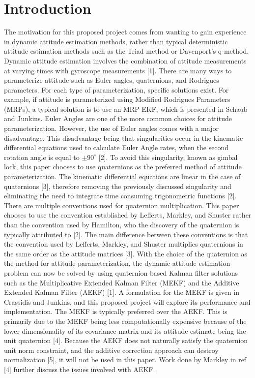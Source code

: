 \documentclass[12pt]{report}
\begin{document}
\newpage
\section*{Introduction}
\noindent The motivation for this proposed project comes from wanting to gain experience in dynamic attitude estimation methods, rather than typical deterministic attitude estimation methods such as the Triad method or Davenport's q-method.  Dynamic attitude estimation involves the combination of attitude measurements at varying times with gyroscope measurements [1]. There are many ways to parameterize attitude such as Euler angles, quaternions, and Rodrigues parameters. For each type of parameterization, specific solutions exist. For example, if attitude is parameterized using Modified Rodrigues Parameters (MRPs), a typical solution is to use an MRP-EKF, which is presented in Schaub and Junkins. Euler Angles are one of the more common choices for attitude parameterization. However, the use of Euler angles comes with a major disadvantage. This disadvantage being that singularities occur in the kinematic differential equations used to calculate Euler Angle rates, when the second rotation angle is equal to $\pm{90^\circ} $ [2]. To avoid this singularity, known as gimbal lock, this paper chooses to use quaternions as the preferred method of attitude parameterization. The kinematic differential equations are linear in the case of quaternions [3], therefore removing the previously discussed singularity and eliminating the need to integrate time consuming trigonometric functions [2].\\

\noindent There are multiple conventions used for quaternion multiplication. This paper chooses to use the convention established by Lefferts, Markley, and Shuster rather than the convention used by Hamilton, who the discovery of the quaternion is typically attributed to [2]. The main difference between these conventions is that the convention used by Lefferts, Markley, and Shuster multiplies quaternions in the same order as the attitude matrices [3]. With the choice of the quaternion as the method for attitude parameterization, the dynamic attitude estimation problem can now be solved by using quaternion based Kalman filter solutions such as the Multiplicative Extended Kalman Filter (MEKF) and the Additive Extended Kalman Filter (AEKF) [1]. A formulation for the MEKF is given in Crassidis and Junkins, and this proposed project will explore its performance and implementation. The MEKF is typically preferred over the AEKF. This is primarily due to the MEKF being less computationally expensive because of the lower dimensionality of its covariance matrix and its attitude estimate being the unit quaternion [4]. Because the AEKF does not naturally satisfy the quaternion unit norm constraint, and the additive correction approach can destroy normalization [5], it will not be used in this paper. Work done by Markley in ref [4] further discuss the issues involved with AEKF.
\end{document}
